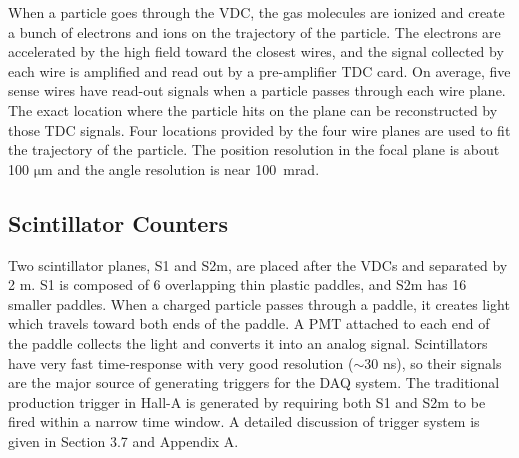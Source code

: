  When a particle goes through the VDC, the gas molecules are ionized and create a bunch of electrons and ions on the trajectory of the particle. The electrons are accelerated by the high field toward the closest wires, and the signal collected by each wire is amplified and read out by a pre-amplifier TDC card. On average, five sense wires have read-out signals when a particle passes through each wire plane. The exact location where the particle hits on the plane can be reconstructed by those TDC signals. Four locations provided by the four wire planes are used to fit the trajectory of the particle. The position resolution in the focal plane is about 100 $\mathrm{\mu m}$ and the angle resolution is near 100~mrad.

\subsection{Scintillator Counters}
 Two scintillator planes, S1 and S2m, are placed after the VDCs and separated by 2 m. S1 is composed of 6 overlapping thin plastic paddles, and S2m has 16 smaller paddles. When a charged particle passes through a paddle, it creates light which travels toward both ends of the paddle. A PMT attached to each end of the paddle collects the light and converts it into an analog signal. Scintillators have very fast time-response with very good resolution ($\mathrm{\sim}$30 ns), so their signals are the major source of generating triggers for the DAQ system. The traditional production trigger in Hall-A is generated by requiring both S1 and S2m to be fired within a narrow time window. A detailed discussion of trigger system is given in Section 3.7 and Appendix A.

